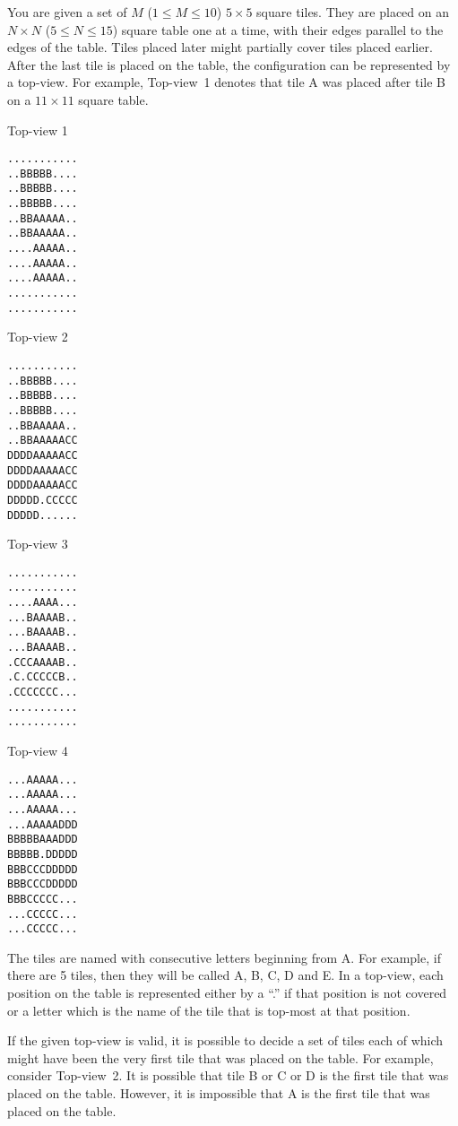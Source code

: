 You are given a set of $M$
($1 \leq M \leq 10$)
$5 \times 5$ square tiles.
They are placed on an $N\times N$
($5 \leq N \leq 15$)
square table one at a time,
with their edges parallel to the edges of the table.
Tiles placed later might partially cover tiles placed earlier.
After the last tile is placed on the table,
the configuration can be represented by a top-view.
For example,
Top-view~1 denotes that tile A was placed after tile B on
a $11 \times 11$ square table.

\begin{center}
\begin{minipage}{1.5in}
Top-view 1
\begin{verbatim}
...........
..BBBBB....
..BBBBB....
..BBBBB....
..BBAAAAA..
..BBAAAAA..
....AAAAA..
....AAAAA..
....AAAAA..
...........
...........
\end{verbatim}
\end{minipage}
\begin{minipage}{1.5in}
Top-view 2
\begin{verbatim}
...........
..BBBBB....
..BBBBB....
..BBBBB....
..BBAAAAA..
..BBAAAAACC
DDDDAAAAACC
DDDDAAAAACC
DDDDAAAAACC
DDDDD.CCCCC
DDDDD......
\end{verbatim}
\end{minipage}
\begin{minipage}{1.5in}
Top-view 3
\begin{verbatim}
...........
...........
....AAAA...
...BAAAAB..
...BAAAAB..
...BAAAAB..
.CCCAAAAB..
.C.CCCCCB..
.CCCCCCC...
...........
...........
\end{verbatim}
\end{minipage}
\begin{minipage}{1.5in}
Top-view 4
\begin{verbatim}
...AAAAA...
...AAAAA...
...AAAAA...
...AAAAADDD
BBBBBAAADDD
BBBBB.DDDDD
BBBCCCDDDDD
BBBCCCDDDDD
BBBCCCCC...
...CCCCC...
...CCCCC...
\end{verbatim}
\end{minipage}
\end{center}

The tiles are named with consecutive letters beginning from A.
For example, if there are 5 tiles, then they will be called
A, B, C, D and E.
In a top-view,
each position on the table is represented
either by a ``.'' if that position is not covered
or a letter which is the name of the tile
that is top-most at that position.

If the given top-view is valid, it is possible to decide
a set of tiles each of which might have been the very first tile that
was placed on the table.
For example,
consider Top-view~2.
It is possible that tile B or C or D
is the first tile that was placed on the table.
However, it is impossible that A is the first tile
that was placed on the table.

